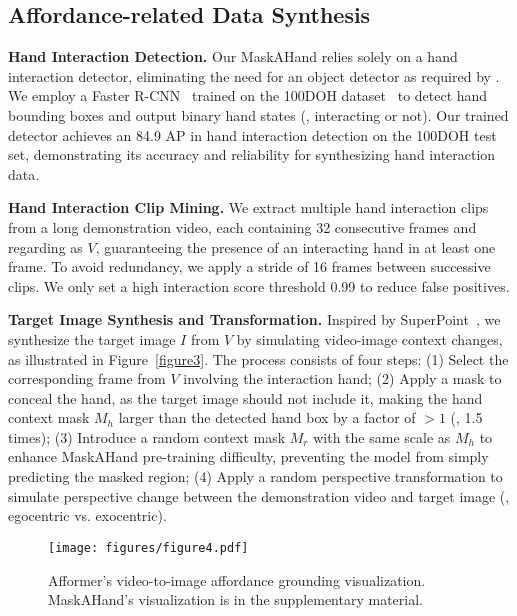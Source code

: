 \documentclass[10pt,twocolumn,letterpaper]{article}
\begin{document}
\subsection{Affordance-related Data Synthesis}

\noindent\textbf{Hand Interaction Detection.} 
Our MaskAHand relies solely on a hand interaction detector, eliminating the need for an object detector as required by \cite{jointhand,probes}. We employ a Faster R-CNN~\cite{faster_rcnn,fpn} trained on the 100DOH dataset~\cite{100doh,epic-kitchens-55,charades-ego,egtea} to detect hand bounding boxes and output binary hand states (\ie, interacting or not). Our trained detector achieves an 84.9 AP in hand interaction detection on the 100DOH test set, demonstrating its accuracy and reliability for synthesizing hand interaction data.

\noindent\textbf{Hand Interaction Clip Mining.}
We extract multiple hand interaction clips from a long demonstration video, each containing 32 consecutive frames and regarding as $V$, guaranteeing the presence of an interacting hand in at least one frame. To avoid redundancy, we apply a stride of 16 frames between successive clips. We only set a high interaction score threshold 0.99 to reduce false positives.

\noindent\textbf{Target Image Synthesis and Transformation.} 
Inspired by SuperPoint~\cite{superpoint}, we synthesize the target image $I$ from $V$ by simulating video-image context changes, as illustrated in Figure~\ref{figure3}. The process consists of four steps: (1) Select the corresponding frame from $V$ involving the interaction hand; (2) Apply a mask to conceal the hand, as the target image should not include it, making the hand context mask $M_h$ larger than the detected hand box by a factor of $>1$ (\eg, 1.5 times); (3) Introduce a random context mask $M_r$ with the same scale as $M_h$ to enhance MaskAHand pre-training difficulty, preventing the model from simply predicting the masked region; (4) Apply a random perspective transformation to simulate perspective change between the demonstration video and target image (\eg, egocentric vs. exocentric). 

\begin{figure*}[t]
    \centering
    \texttt{[image: figures/figure4.pdf]}
    \caption{Afformer's video-to-image affordance grounding visualization. MaskAHand's visualization is in the supplementary material. \vspace{-3mm}}
    \label{figure4}
\end{figure*}
\end{document}
